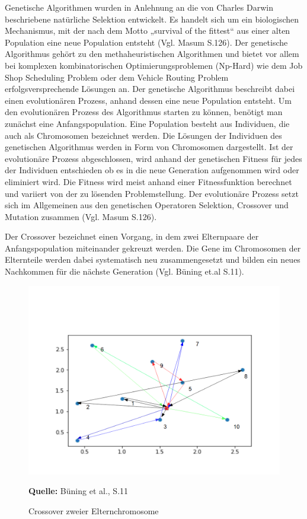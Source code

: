 \documentclass[a4paper,12pt,parskip,bibtotoc,liststotoc]{article}
\begin{document}
Genetische Algorithmen wurden in Anlehnung an die von Charles Darwin beschriebene natürliche Selektion entwickelt. Es handelt sich um ein biologischen Mechanismus, mit der nach dem Motto „survival of the fittest“ aus einer alten Population eine neue Population entsteht (Vgl. Masum S.126).
Der genetische Algorithmus gehört zu den methaheuristischen Algorithmen und bietet vor allem bei komplexen kombinatorischen Optimierungsproblemen (Np-Hard) wie dem Job Shop Scheduling Problem oder dem Vehicle Routing Problem erfolgsversprechende Lösungen an. 
Der genetische Algorithmus beschreibt dabei einen evolutionären Prozess, anhand dessen eine neue Population entsteht.
Um den evolutionären Prozess des Algorithmus starten zu können, benötigt man zunächst eine Anfangspopulation. 
Eine Population besteht aus Individuen, die auch als Chromosomen bezeichnet werden.
Die Lösungen der Individuen des genetischen Algorithmus werden in Form von Chromosomen dargestellt. 
Ist der evolutionäre Prozess abgeschlossen, wird anhand der genetischen Fitness für jedes der Individuen entschieden ob es in die neue Generation aufgenommen wird oder eliminiert wird. 
Die Fitness wird meist anhand einer Fitnessfunktion berechnet und variiert von der zu lösenden Problemstellung.
Der evolutionäre Prozess setzt sich im Allgemeinen aus den genetischen Operatoren Selektion, Crossover und Mutation zusammen (Vgl. Masum S.126).
 
Der Crossover bezeichnet einen Vorgang, in dem zwei Elternpaare der Anfangspopulation miteinander gekreuzt werden. 
Die Gene im Chromosomen der Elternteile werden dabei systematisch neu zusammengesetzt und bilden ein neues Nachkommen für die nächste Generation (Vgl. Büning et.al S.11).


\begin{figure}[h!]
  \begin{center}
    \includegraphics[width=150mm]{vrppp2.png}
    \caption{ Crossover zweier Elternchromosome }  \label{Typen}
    {\footnotesize \textbf{Quelle:} Büning et al., S.11}
  \end{center}
\end{figure}
\end{document}
